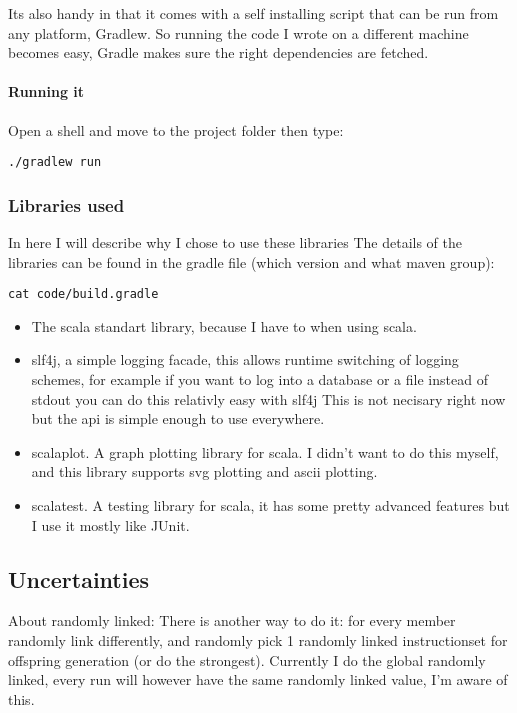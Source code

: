 \documentclass{article}
\begin{document}
\begin{empfile}
Its also handy in that it comes with a self installing script that can be run
from any platform, Gradlew. So running the code I wrote on a different machine
becomes easy, Gradle makes sure the right dependencies are fetched.

\paragraph{Running it}

Open a shell and move to the project folder then type:

\lstset{language=Bash}
\begin{lstlisting}[frame=single]
	./gradlew run
\end{lstlisting}

\subsubsection{Libraries used}
In here I will describe why I chose to use these libraries
The details of the libraries can be found in the gradle file (which
version and what maven group):

\begin{lstlisting}[frame=single]
	cat code/build.gradle
\end{lstlisting}


\begin{itemize}
	\item The scala standart library, because I have to when using scala.
	\item slf4j, a simple logging facade, this allows runtime switching of
		logging schemes, for example if you want to log into a database or
		a file instead of stdout you can do this relativly easy with slf4j
		This is not necisary right now but the api is simple enough to use
		everywhere.
	\item scalaplot. A graph plotting library for scala. I didn't want to
		do this myself, and this library supports svg plotting and ascii
		plotting.
	\item scalatest. A testing library for scala, it has some pretty advanced
		features but I use it mostly like JUnit.
\end{itemize}
\subsection{Uncertainties}
About randomly linked:
	There is another way to do it: for every member randomly link
	differently, and randomly pick 1 randomly linked instructionset
	for offspring generation (or do the strongest).
	Currently I do the global randomly linked, every run will however
	have the same randomly linked value, I'm aware of this.


\end{empfile}
\end{document}
